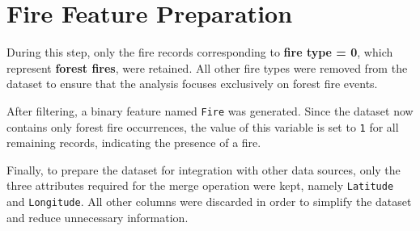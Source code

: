 \section{Fire Feature Preparation}

During this step, only the fire records corresponding to \textbf{fire type = 0}, which represent \textbf{forest fires}, were retained. All other fire types were removed from the dataset to ensure that the analysis focuses exclusively on forest fire events.

After filtering, a binary feature named \texttt{Fire} was generated. Since the dataset now contains only forest fire occurrences, the value of this variable is set to \texttt{1} for all remaining records, indicating the presence of a fire.

Finally, to prepare the dataset for integration with other data sources, only the three attributes required for the merge operation were kept, namely \texttt{Latitude} and \texttt{Longitude}. All other columns were discarded in order to simplify the dataset and reduce unnecessary information.
